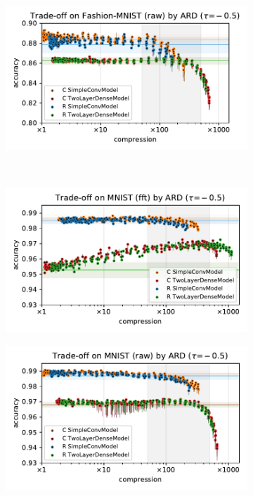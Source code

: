 \documentclass[a4paper,10pt,onecolumn]{article}
\begin{document}
\begin{figure}[b]
\begin{subfigure}[b]{0.5\columnwidth}
  \end{subfigure}%
  \begin{subfigure}[b]{0.5\columnwidth}
    \centering
    \includegraphics[width=\columnwidth]{figure__mnist-like__trade-off/appendix__ARD__fashionmnist__raw__-0.5.pdf}
  \end{subfigure} \\ %
  \begin{subfigure}[b]{0.5\columnwidth}
    \centering
    \includegraphics[width=\columnwidth]{figure__mnist-like__trade-off/appendix__ARD__mnist__fft__-0.5.pdf}
  \end{subfigure}%
  \begin{subfigure}[b]{0.5\columnwidth}
    \centering
    \includegraphics[width=\columnwidth]{figure__mnist-like__trade-off/appendix__ARD__mnist__raw__-0.5.pdf}

\end{subfigure}
\end{figure}
\end{document}
